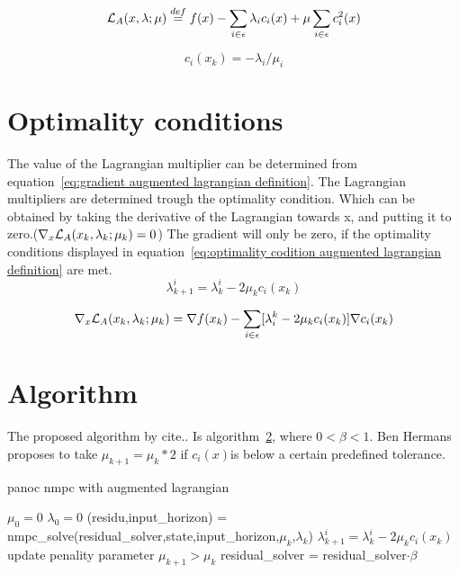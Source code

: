 	\begin{equation}
		\mathcal{L}_A(x,\lambda;\mu) \overset{def}{=} f(x) - \sum_{i \in \epsilon}\lambda_ic_i(x) + \mu \sum_{i \in \epsilon}c_i^2(x)
		\label{eq:augmented lagrangian definition}
	\end{equation}
			
	\begin{equation}
		c_i(x_k) = -\lambda_i/\mu_i
		\label{eq:perturbed feasibility conditions}
	\end{equation}
	

\section{Optimality conditions}
	The value of the Lagrangian multiplier can be determined from equation~\ref{eq:gradient augmented lagrangian definition}. The Lagrangian multipliers are determined trough the optimality condition. Which can be obtained by taking the derivative of the Lagrangian towards x, and putting it to zero.($\nabla_x \mathcal{L}_A(x_k,\lambda_k;\mu_k) = 0$) The gradient will only be zero, if the optimality conditions displayed in equation~\ref{eq:optimality codition augmented lagrangian definition} are met.
	\begin{equation}
		\lambda_{k+1}^{i} = \lambda_{k}^{i} - 2\mu_k c_i(x_k)
		\label{eq:optimality codition augmented lagrangian definition}
	\end{equation}

	\begin{equation}
		\nabla_x \mathcal{L}_A(x_k,\lambda_k;\mu_k) = \nabla f(x_k) - \sum_{i \in \epsilon} [\lambda_i^k - 2\mu_k c_i(x_k)] \nabla c_i(x_k)
		\label{eq:gradient augmented lagrangian definition}
	\end{equation}	
	
	
	
\section{Algorithm}
	The proposed algorithm by cite.. Is algorithm~\ref{}, where $0<\beta<1$. Ben Hermans proposes to take $\mu_{k+1}=\mu_k*2$ if $c_i(x)$is below a certain predefined tolerance. 
	
	\begin{algorithm}
		\caption{panoc nmpc with augmented lagrangian}
		\label{alg:panoc with augmented lagrangian}
		\begin{algorithmic}[1]
			\State $\mu_0=0$
			\State $\lambda_0=0$
			\State (residu,input\_horizon) = nmpc\_solve(residual\_solver,state,input\_horizon,$\mu_k$,$\lambda_k$)
			\State $\lambda_{k+1}^{i} = \lambda_{k}^{i} - 2\mu_k c_i(x_k)$
			\State update penality parameter $\mu_{k+1}>\mu_k$
			\State residual\_solver =  residual\_solver$\cdot \beta$
			\EndWhile
			\EndProcedure
		\end{algorithmic}
	\end{algorithm}


	
		
		